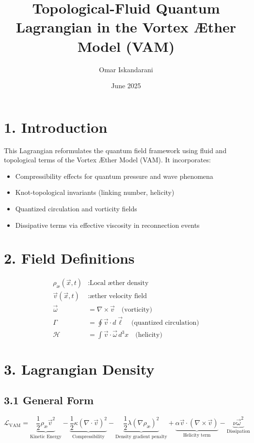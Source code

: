 \documentclass[12pt]{article}
\title{Topological-Fluid Quantum Lagrangian in the Vortex \AE ther Model (VAM)}
\author{Omar Iskandarani}
\date{June 2025}
\begin{document}
\maketitle

\section*{1. Introduction}
This Lagrangian reformulates the quantum field framework using fluid and topological terms of the Vortex \AE ther Model (VAM). It incorporates:
\begin{itemize}
    \item Compressibility effects for quantum pressure and wave phenomena
    \item Knot-topological invariants (linking number, helicity)
    \item Quantized circulation and vorticity fields
    \item Dissipative terms via effective viscosity in reconnection events
\end{itemize}

\section*{2. Field Definitions}
\begin{align*}
\rho_\text{\ae}(\vec{x},t) &: \text{Local \ae ther density} \\
\vec{v}(\vec{x},t) &: \text{\ae ther velocity field} \\
\vec{\omega} &= \nabla \times \vec{v} \quad \text{(vorticity)} \\
\Gamma &= \oint \vec{v} \cdot d\vec{\ell} \quad \text{(quantized circulation)} \\
\mathcal{H} &= \int \vec{v} \cdot \vec{\omega} \, d^3x \quad \text{(helicity)}
\end{align*}

\section*{3. Lagrangian Density}
\subsection*{3.1 General Form}
\begin{equation}
\mathcal{L}_\text{VAM} = \underbrace{\frac{1}{2} \rho_\text{\ae} \vec{v}^2}_{\text{Kinetic Energy}} - \underbrace{\frac{1}{2} \kappa (\nabla \cdot \vec{v})^2}_{\text{Compressibility}} - \underbrace{\frac{1}{2} \lambda (\nabla \rho_\text{\ae})^2}_{\text{Density gradient penalty}} + \underbrace{\alpha \vec{v} \cdot (\nabla \times \vec{v})}_{\text{Helicity term}} - \underbrace{\nu \vec{\omega}^2}_{\text{Dissipation}}
\end{equation}
\end{document}
